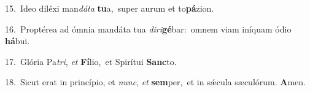 {\numbfont\textcolor{\numbcolor}{15.}}~Ideo diléxi man\-\textit{dá}\-\textit{ta} \textbf{tu}\-a,~\star super aurum et to\-\textbf{pá}\-zion.\par
{\numbfont\textcolor{\numbcolor}{16.}}~Proptérea ad ómnia mandáta tua \textit{di}\-\textit{ri}\textbf{gé}bar:~\star omnem viam iníquam ódio \textbf{há}\-bui.\par
{\numbfont\textcolor{\numbcolor}{17.}}~Glória Pa\-\textit{tri}\-, \textit{et} \textbf{Fí}\-lio,~\star et Spirítui \textbf{Sanc}\-to.\par
{\numbfont\textcolor{\numbcolor}{18.}}~Sicut erat in princípio, et \textit{nunc}\-, \textit{et} \textbf{sem}\-per,~\star et in sǽcula sæculórum. \textbf{A}\-men.\par
